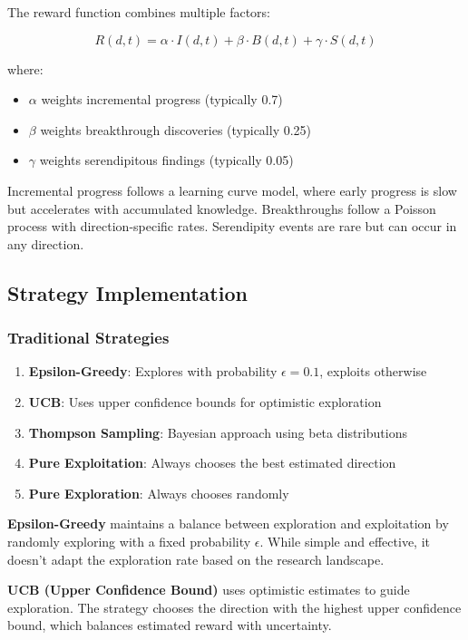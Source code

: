\documentclass[letterpaper]{article}
\begin{document}
The reward function combines multiple factors:

\begin{equation}
R(d, t) = \alpha \cdot I(d, t) + \beta \cdot B(d, t) + \gamma \cdot S(d, t)
\end{equation}

where:
\begin{itemize}
\item $\alpha$ weights incremental progress (typically 0.7)
\item $\beta$ weights breakthrough discoveries (typically 0.25)
\item $\gamma$ weights serendipitous findings (typically 0.05)
\end{itemize}

Incremental progress follows a learning curve model, where early progress is slow but accelerates with accumulated knowledge. Breakthroughs follow a Poisson process with direction-specific rates. Serendipity events are rare but can occur in any direction.

\subsection{Strategy Implementation}

\subsubsection{Traditional Strategies}

\begin{enumerate}
\item \textbf{Epsilon-Greedy}: Explores with probability $\epsilon = 0.1$, exploits otherwise
\item \textbf{UCB}: Uses upper confidence bounds for optimistic exploration
\item \textbf{Thompson Sampling}: Bayesian approach using beta distributions
\item \textbf{Pure Exploitation}: Always chooses the best estimated direction
\item \textbf{Pure Exploration}: Always chooses randomly
\end{enumerate}

\textbf{Epsilon-Greedy} maintains a balance between exploration and exploitation by randomly exploring with a fixed probability $\epsilon$. While simple and effective, it doesn't adapt the exploration rate based on the research landscape.

\textbf{UCB (Upper Confidence Bound)} uses optimistic estimates to guide exploration. The strategy chooses the direction with the highest upper confidence bound, which balances estimated reward with uncertainty.
\end{document}
